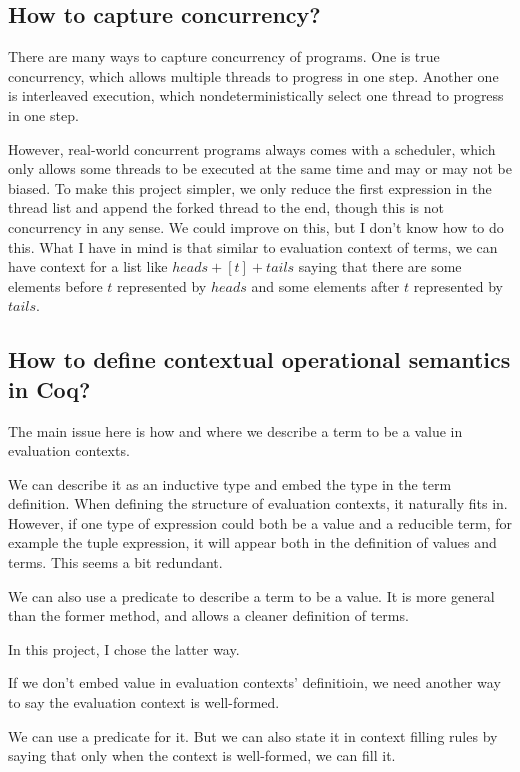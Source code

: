 \documentclass{article}
\begin{document}
\subsection{How to capture concurrency?}

There are many ways to capture concurrency of programs. One is true concurrency, which allows multiple
threads to progress in one step. Another one is interleaved execution, which nondeterministically select
one thread to progress in one step.

However, real-world concurrent programs always comes with a scheduler, which only allows some threads to
be executed at the same time and may or may not be biased. To make this project simpler, we only reduce the
first expression in the thread list and append the forked thread to the end, though this is not concurrency in any
sense. We could improve on this, but I don't know how to do this. What I have in mind is that similar to
evaluation context of terms, we can have context for a list like $heads + [t] + tails$ saying that there are
some elements before $t$ represented by $heads$ and some elements after $t$ represented by $tails$.

\subsection{How to define contextual operational semantics in Coq?}

The main issue here is how and where we describe a term to be a value in evaluation contexts.

We can describe it as an inductive type and embed the type in the term definition.
When defining the structure of evaluation contexts, it naturally fits in. However, if one type of
expression could both be a value and a reducible term, for example the tuple expression, it will appear
both in the definition of values and terms. This seems a bit redundant.

We can also use a predicate to describe a term to be a value. It is more general than the former method, and allows
a cleaner definition of terms.

In this project, I chose the latter way.

\bigbreak

If we don't embed value in evaluation contexts' definitioin, we need another way to say the evaluation context
is well-formed.

We can use a predicate for it. But we can also state it in context filling rules by saying that only
when the context is well-formed, we can fill it.
\end{document}

